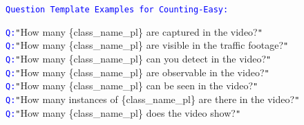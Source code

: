 \begin{figure*}[htbp]
\centering
\begin{tcolorbox}[colback=gray!10,%
	colframe=black,%
	width=\textwidth,
	arc=1mm, auto outer arc,
	boxrule=0.5pt,
	]


 	\texttt{\textcolor{blue}{Question Template Examples for Counting-Easy:}}
  
        \texttt{\textcolor{blue}{Q:}}\texttt{"}How many \mbox{\{class\_name\_pl\}} are captured in the video?\texttt{"}\\
        \texttt{\textcolor{blue}{Q:}}\texttt{"}How many \mbox{\{class\_name\_pl\}} are visible in the traffic footage?\texttt{"}\\
        \texttt{\textcolor{blue}{Q:}}\texttt{"}How many \mbox{\{class\_name\_pl\}} can you detect in the video?\texttt{"}\\
        \texttt{\textcolor{blue}{Q:}}\texttt{"}How many \mbox{\{class\_name\_pl\}} are observable in the video?\texttt{"}\\
        \texttt{\textcolor{blue}{Q:}}\texttt{"}How many \mbox{\{class\_name\_pl\}} can be seen in the video?\texttt{"}\\
        \texttt{\textcolor{blue}{Q:}}\texttt{"}How many instances of \mbox{\{class\_name\_pl\}} are there in the video?\texttt{"}\\
        \texttt{\textcolor{blue}{Q:}}\texttt{"}How many \mbox{\{class\_name\_pl\}} does the video show?\texttt{"}\\


\end{tcolorbox}
\end{figure*}
